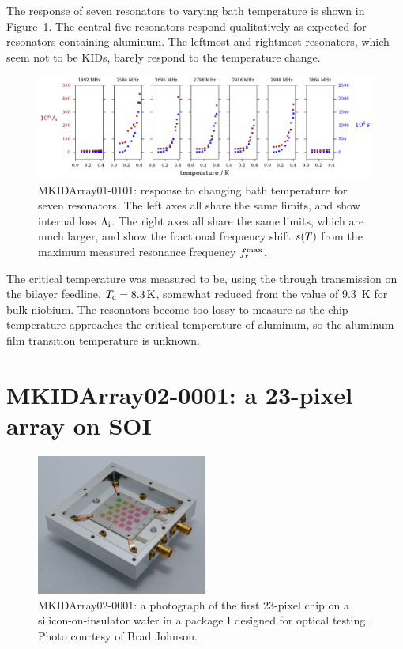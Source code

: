 The response of seven resonators to varying bath temperature is shown in Figure~\ref{fig:mkidarray01_seven_s_and_i_vs_temperature}.
The central five resonators respond qualitatively as expected for resonators containing aluminum.
The leftmost and rightmost resonators, which seem not to be KIDs, barely respond to the temperature change.

\begin{figure}[htb]
\centering
\includegraphics[width=\textwidth]{multichroic/mkidarray01_seven_s_and_i_vs_temperature.pdf}
\caption[MKIDArray01-0101: response to changing bath temperature for seven resonators.]
{
MKIDArray01-0101: response to changing bath temperature for seven resonators.
The left axes all share the same limits, and show internal loss $\Lambda_{\mathrm{i}}$.
The right axes all share the same limits, which are much larger, and show the fractional frequency shift
$s(T)$
from the maximum measured resonance frequency $f_{\mathrm{r}}^\mathrm{max}$.
}
\label{fig:mkidarray01_seven_s_and_i_vs_temperature}
\end{figure}

The critical temperature was measured to be, using the through transmission on the bilayer feedline, $T_{\mathrm{c}} = \SI{8.3}{K}$, somewhat reduced from the value of \SI{9.3}{K} for bulk niobium.
The resonators become too lossy to measure as the chip temperature approaches the critical temperature of aluminum, so the aluminum film transition temperature is unknown.


\section{MKIDArray02-0001: a 23-pixel array on SOI}
\label{sec:multichroic.mkidarray02}

\begin{figure}[htb]
\centering
\includegraphics[width=0.5\textwidth]{multichroic/MKIDArray02-0001_in_package.jpg}
\caption[MKIDArray02-0001: a photograph of the first 23-pixel chip on a silicon-on-insulator wafer.]
{
MKIDArray02-0001: a photograph of the first 23-pixel chip on a silicon-on-insulator wafer in a package I designed for optical testing.
Photo courtesy of Brad Johnson.
}
\label{fig:MKIDArray02-0001_photo}
\end{figure}

